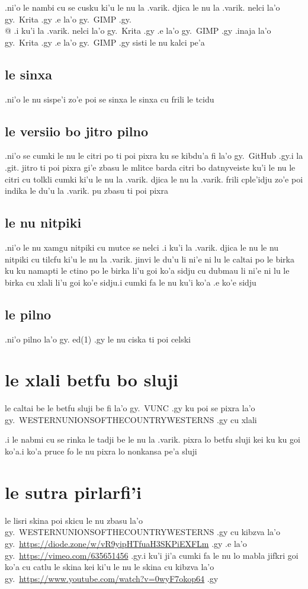 \documentclass{report}
\begin{document}
.ni'o le nambi cu se cusku ki'u le nu la .varik. djica le nu la .varik. nelci la'o gy.\ Krita .gy .e la'o gy.\ GIMP .gy.\\@  .i ku'i la .varik. nelci la'o gy.\ Krita .gy .e la'o gy.\ GIMP .gy .inaja la'o gy.\ Krita .gy .e la'o gy.\ GIMP .gy sisti le nu kalci pe'a

\subsection{le sinxa}
.ni'o le nu sispe'i zo'e poi se sinxa le sinxa cu frili le tcidu

\subsection{le versiio bo jitro pilno}
.ni'o se cumki le nu le citri po ti poi pixra ku se kibdu'a fi la'o gy.\ GitHub .gy\@  .i la .git. jitro ti poi pixra gi'e zbasu le mlitce barda citri bo datnyveiste
ku'i le nu le citri cu tolkli cumki ki'u le nu la .varik. djica le nu la .varik. frili cple'idju zo'e poi indika le du'u la .varik. pu zbasu ti poi pixra

\subsection{le nu nitpiki}
.ni'o le nu xamgu nitpiki cu mutce se nelci  .i ku'i la .varik. djica le nu le nu nitpiki cu tilcfu ki'u le nu la .varik. jinvi le du'u li ni'e ni lu le caltai po le birka ku ku namapti le ctino po le birka li'u goi ko'a sidju cu dubmau li ni'e ni lu le birka cu xlali li'u goi ko'e sidju\@  .i cumki fa le nu ku'i ko'a .e ko'e sidju

\subsection{le pilno}
.ni'o pilno la'o gy. ed(1) .gy le nu ciska ti poi celski

\section{le xlali betfu bo sluji}
le caltai be le betfu sluji be fi la'o gy.\ VUNC .gy ku poi se pixra la'o gy.\ WESTERNUNIONSOFTHECOUNTRYWESTERNS .gy cu xlali

.i le nabmi cu se rinka le tadji be le nu la .varik. pixra lo betfu sluji kei ku ku goi ko'a\@  .i ko'a pruce fo le nu pixra lo nonkansa pe'a sluji

\section{le sutra pirlarfi'i}
le lisri skina poi skicu le nu zbasu la'o gy.\ WESTERNUNIONSOFTHECOUNTRYWESTERNS .gy cu kibzva la'o gy.\ \url{https://diode.zone/w/vR9yipHTfuaH3SKPiEXFLm} .gy .e la'o gy.\ \url{https://vimeo.com/635651456} .gy\@  .i ku'i ji'a cumki fa le nu lo mabla jifkri goi ko'a cu catlu le skina kei ki'u le nu le skina cu kibzva la'o gy.\ \url{https://www.youtube.com/watch?v=0wyF7okop64} .gy
\end{document}

